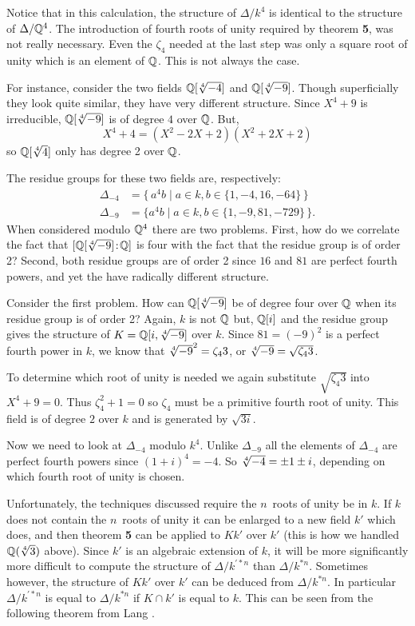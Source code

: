 Notice that in this calculation, the structure of 
$\Delta /k^4$ is identical to the structure of
$\Delta / \mathbb{Q}^4$.  The introduction of fourth roots of unity
required by theorem {\bf 5}, was not really necessary.  Even the
$\zeta_4$ needed at the last step was only a square root of unity which
is an element of $\mathbb{Q}$.  This is not always the case.  

For instance, consider the two fields
$\Q[\root4\of{-4}]$ and $\Q[\root4\of{-9}]$.  Though superficially they
look quite similar, they have very different structure.  Since $X^4+9$
is irreducible, $\Q[\root4\of{-9}]$ is of degree $4$ over $\mathbb{Q}$.  But,
\[
X^4+4 = (X^2 - 2X +2)(X^2 +2X+2)
\]
so $\Q[\root4\of4]$ only has degree 2 over $\mathbb{Q}$.

The residue groups for these two fields are, respectively:
\[
\begin{aligned}
  \Delta_{-4} &= \{\, a^4 b \mid a \in k, b\in \{1, -4, 16, -64\}\,\} \\
  \Delta_{-9} &= \{a^4 b \mid a \in k, b \in \{1, -9, 81, -729\}\,\}.
\end{aligned}
\]
When considered modulo $\mathbb{Q}^4$ there are two problems.  First, how do we
correlate the fact that $\fieldDegree{\Q[\root4\of{-9}]}{\Q}$ is four with the
fact that the residue group is of order 2? Second, both residue groups
are of order 2 since $16$ and $81$ are perfect fourth powers, and yet
the have radically different structure.  

Consider the first problem.  How can $\Q[\root4\of{-9}]$ be of degree
four over $\mathbb{Q}$ when its residue group is of order 2?  Again, $k$ is not
$\mathbb{Q}$ but, $\mathbb{Q}[i]$ and the residue group gives the structure of 
$K = \Q[i, \root4\of{-9}]$ over $k$.  Since $81 = (-9)^2$ is a perfect
fourth power in $k$, we know that $\root4\of{-9}^2 = \zeta_4 3$, or 
$\root4\of{-9} = \sqrt{\zeta_4 3}$.

To determine which root of unity is needed we again substitute
$\sqrt{\zeta_4 3}$ into $X^4+9=0$.  Thus $\zeta_4^2+1=0$ so $\zeta_4$
must be a primitive fourth root of unity.  This field is of degree $2$
over $k$ and is generated by $\sqrt{3i}$.

Now we need to look at $\Delta_{-4}$ modulo $k^4$.  Unlike $\Delta_{-9}$
all the elements of $\Delta_{-4}$ are perfect fourth powers since
$(1+i)^4 = -4$.  So $\root4\of{-4} = \pm 1\pm i$, depending on which
fourth root of unity is chosen. 

Unfortunately, the techniques discussed require the $n$\th\ roots
of unity be in $k$.  If $k$ does not contain the $n$\th\ roots of unity
it can be enlarged to a new field $k'$ which does, and then theorem {\bf
5} can be applied to $Kk'$ over $k'$ (this is how we handled $\Q(\root
4\of 3)$ above).  Since $k'$ is an algebraic
extension of $k$, it will be more significantly more difficult to
compute the structure of $\Delta/k^{\prime \ast n}$ than 
$\Delta/k^{\ast n}$.  Sometimes however, the structure of
$Kk'$ over $k'$ can be deduced from $\Delta/k^{\ast n}$.  In particular
$\Delta/k^{\prime\ast n}$ is equal to $\Delta/k^{\ast n}$ if $K \cap k'$
is equal to $k$.  This can be seen from the following theorem from
Lang \cite{Lang1992-uk}. 

